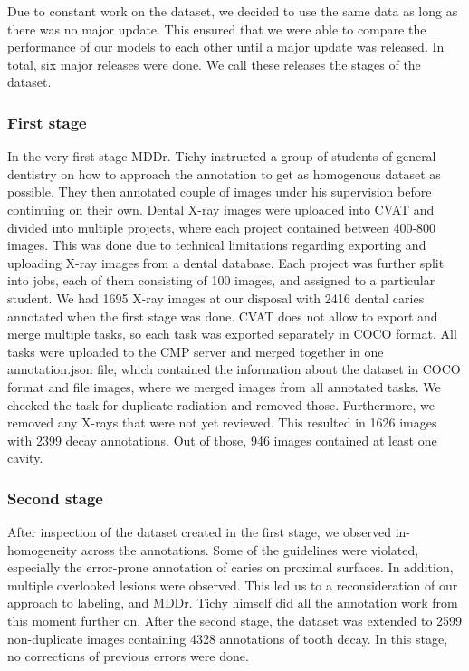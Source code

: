 Due to constant work on the dataset, we decided to use the same data as long as there was no major update. This ensured that we were able to compare the performance of our models to each other until a major update was released. In total, six major releases were done. We call these releases the stages of the dataset.

\subsubsection{First stage}
In the very first stage MDDr. Tichy instructed a group of students of general dentistry on how to approach the annotation to get as homogenous dataset as possible. They then annotated couple of images under his supervision before continuing on their own.
Dental X-ray images were uploaded into CVAT and divided into multiple projects, where each project contained between 400-800 images. This was done due to technical limitations regarding exporting and uploading X-ray images from a dental database. Each project was further split into jobs, each of them consisting of 100 images, and assigned to a particular student. We had 1695 X-ray images at our disposal with 2416 dental caries annotated when the first stage was done. CVAT does not allow to export and merge multiple tasks, so each task was exported separately in COCO format. All tasks were uploaded to the CMP server and merged together in one annotation.json file, which contained the information about the dataset in COCO format and file images, where we merged images from all annotated tasks. We checked the task for duplicate radiation and removed those. Furthermore, we removed any X-rays that were not yet reviewed. This resulted in 1626 images with 2399 decay annotations. Out of those, 946 images contained at least one cavity.


\subsubsection{Second stage}
After inspection of the dataset created in the first stage, we observed in-homogeneity across the annotations. Some of the guidelines were violated, especially the error-prone annotation of caries on proximal surfaces. In addition, multiple overlooked lesions were observed. This led us to a reconsideration of our approach to labeling, and MDDr. Tichy himself did all the annotation work from this moment further on. After the second stage, the dataset was extended to 2599 non-duplicate images containing 4328 annotations of tooth decay. In this stage, no corrections of previous errors were done.

